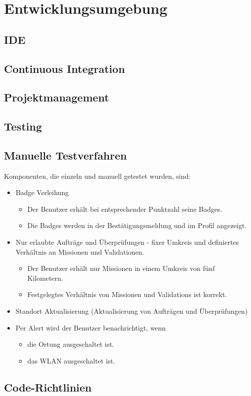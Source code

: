 \chapter{Entwicklungsumgebung}
\label{pd-entwicklungsumgebung}


\section{IDE}


\section{Continuous Integration}


\section{Projektmanagement}


\section{Testing}

\section{Manuelle Testverfahren}
Komponenten, die einzeln und manuell getestet wurden, sind:
\begin{itemize}
	\item Badge Verleihung
	\begin{itemize}
		\item Der Benutzer erhält bei entsprechender Punktzahl seine Badges.
		\item Die Badges werden in der Bestätigungsmeldung und im Profil angezeigt.
	\end{itemize}
	\item Nur erlaubte Aufträge und Überprüfungen  - fixer Umkreis und definiertes Verhältnis an Missionen und Validationen.
	\begin{itemize}
		\item Der Benutzer erhält nur Missionen in einem Umkreis von fünf Kilometern.
		\item Festgelegtes Verhältnis von Missionen und Validations ist korrekt.
	\end{itemize}
	\item Standort Aktualisierung (Aktualisierung von Aufträgen und Überprüfungen)
	\item Per Alert wird der Benutzer benachrichtigt, wenn
	\begin{itemize}
		\item die Ortung ausgeschaltet ist.
		\item das WLAN ausgeschaltet ist.
	\end{itemize}
\end{itemize}


\section{Code-Richtlinien}